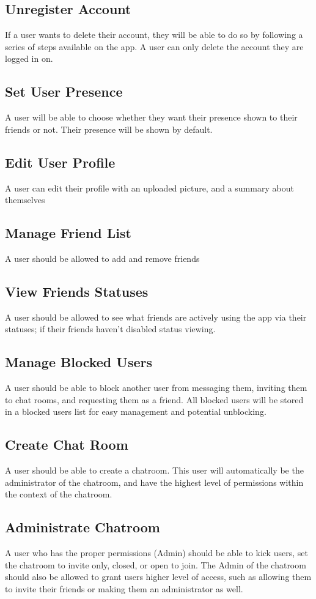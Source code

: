 \documentclass[11pt]{article}
\theoremstyle{plain}
\theoremstyle{definition}
\begin{document}
\subsection{Unregister Account}
If a user wants to delete their account, they will be able to do so by following a series of steps available on the app. A user can only delete the account they are logged in on.
\subsection{Set User Presence}
A user will be able to choose whether they want their presence shown to their friends or not. Their presence will be shown by default.
\subsection{Edit User Profile}
A user can edit their profile with an uploaded picture, and a summary about themselves
\subsection{Manage Friend List}
A user should be allowed to add and remove friends
\subsection{View Friends Statuses}
A user should be allowed to see what friends are actively using the app via their statuses; if their friends haven't disabled status viewing. 
\subsection{Manage Blocked Users}
A user should be able to block another user from messaging them, inviting them to chat rooms, and requesting them as a friend. All blocked users will be stored in a blocked users list for easy management and potential unblocking. 
\subsection{Create Chat Room}
A user should be able to create a chatroom. This user will automatically be the administrator of the chatroom, and have the highest level of permissions within the context of the chatroom.
\subsection{Administrate Chatroom}
A user who has the proper permissions (Admin) should be able to kick users, set the chatroom to invite only, closed, or open to join. The Admin of the chatroom should also be allowed to grant users higher level of access, such as allowing them to invite their friends or making them an administrator as well.
\end{document}
